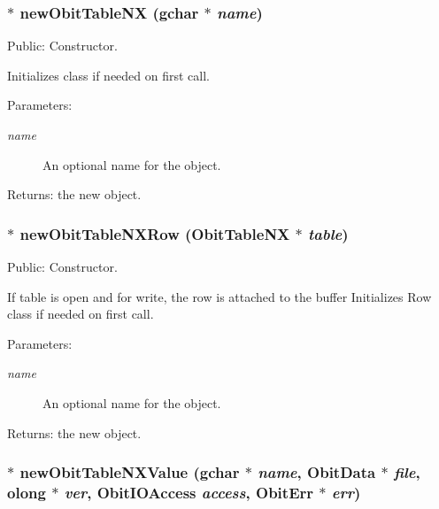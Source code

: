 \subsubsection{$\ast$ new\-Obit\-Table\-NX (gchar $\ast$ {\em name})}\label{ObitTableNX_8c_a16}


Public: Constructor. 

Initializes class if needed on first call. \begin{Desc}
\item[Parameters:]
\begin{description}
\item[{\em name}]An optional name for the object. \end{description}
\end{Desc}
\begin{Desc}
\item[Returns:]the new object. \end{Desc}
\subsubsection{$\ast$ new\-Obit\-Table\-NXRow ({\bf Obit\-Table\-NX} $\ast$ {\em table})}\label{ObitTableNX_8c_a14}


Public: Constructor. 

If table is open and for write, the row is attached to the buffer Initializes Row class if needed on first call. \begin{Desc}
\item[Parameters:]
\begin{description}
\item[{\em name}]An optional name for the object. \end{description}
\end{Desc}
\begin{Desc}
\item[Returns:]the new object. \end{Desc}
\subsubsection{$\ast$ new\-Obit\-Table\-NXValue (gchar $\ast$ {\em name}, {\bf Obit\-Data} $\ast$ {\em file}, {\bf olong} $\ast$ {\em ver}, Obit\-IOAccess {\em access}, {\bf Obit\-Err} $\ast$ {\em err})}\label{ObitTableNX_8c_a18}


